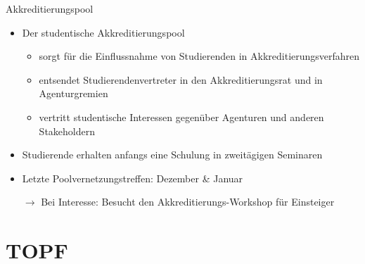 \documentclass[compress, aspectratio=169]{beamer}
\begin{document}
\begin{frame}{Akkreditierungspool}
    \begin{itemize}
        \item Der studentische Akkreditierungspool
        \begin{itemize}
        	\item sorgt für die Einflussnahme von Studierenden in Akkreditierungsverfahren
        	\item entsendet Studierendenvertreter in den Akkreditierungsrat und in Agenturgremien
        	\item vertritt studentische Interessen gegenüber Agenturen und anderen Stakeholdern
        \end{itemize}         
        \item Studierende erhalten anfangs eine Schulung in zweitägigen Seminaren
        \item Letzte Poolvernetzungstreffen: Dezember \& Januar
        \vspace{0.5cm}
        \item[$\rightarrow$] Bei Interesse: Besucht den Akkreditierungs-Workshop für Einsteiger
    \end{itemize}
\end{frame}


\section{TOPF}
\end{document}
